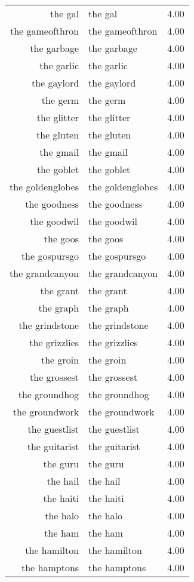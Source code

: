 \begin{table}[ht]
\begin{tabular}{rlr}
  the gal & the gal & 4.00 \\ 
  the gameofthron & the gameofthron & 4.00 \\ 
  the garbage & the garbage & 4.00 \\ 
  the garlic & the garlic & 4.00 \\ 
  the gaylord & the gaylord & 4.00 \\ 
  the germ & the germ & 4.00 \\ 
  the glitter & the glitter & 4.00 \\ 
  the gluten & the gluten & 4.00 \\ 
  the gmail & the gmail & 4.00 \\ 
  the goblet & the goblet & 4.00 \\ 
  the goldenglobes & the goldenglobes & 4.00 \\ 
  the goodness & the goodness & 4.00 \\ 
  the goodwil & the goodwil & 4.00 \\ 
  the goos & the goos & 4.00 \\ 
  the gospursgo & the gospursgo & 4.00 \\ 
  the grandcanyon & the grandcanyon & 4.00 \\ 
  the grant & the grant & 4.00 \\ 
  the graph & the graph & 4.00 \\ 
  the grindstone & the grindstone & 4.00 \\ 
  the grizzlies & the grizzlies & 4.00 \\ 
  the groin & the groin & 4.00 \\ 
  the grossest & the grossest & 4.00 \\ 
  the groundhog & the groundhog & 4.00 \\ 
  the groundwork & the groundwork & 4.00 \\ 
  the guestlist & the guestlist & 4.00 \\ 
  the guitarist & the guitarist & 4.00 \\ 
  the guru & the guru & 4.00 \\ 
  the hail & the hail & 4.00 \\ 
  the haiti & the haiti & 4.00 \\ 
  the halo & the halo & 4.00 \\ 
  the ham & the ham & 4.00 \\ 
  the hamilton & the hamilton & 4.00 \\ 
  the hamptons & the hamptons & 4.00 \\ 

\end{tabular}
\end{table}
